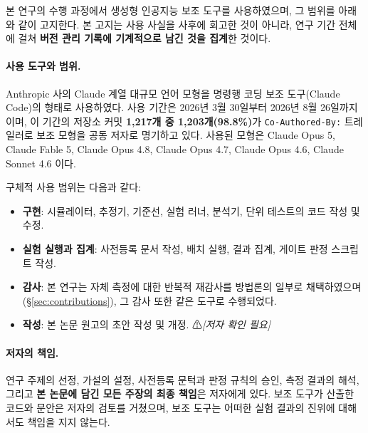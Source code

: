 \documentclass[11pt]{report}
\numberwithin{equation}{chapter}
\numberwithin{figure}{chapter}
\numberwithin{table}{chapter}
\begin{document}
\noindent
본 연구의 수행 과정에서 생성형 인공지능 보조 도구를 사용하였으며, 그 범위를 아래와 같이
고지한다. 본 고지는 사용 사실을 사후에 회고한 것이 아니라, 연구 기간 전체에 걸쳐
\textbf{버전 관리 기록에 기계적으로 남긴 것을 집계}한 것이다.

\paragraph{사용 도구와 범위.}
Anthropic 사의 Claude 계열 대규모 언어 모형을 명령행 코딩 보조 도구(Claude Code)의
형태로 사용하였다. 사용 기간은 2026년 3월 30일부터 2026년 8월 26일까지이며,
이 기간의 저장소 커밋 \textbf{1{,}217개 중 1{,}203개(98.8\%)}가
\texttt{Co-Authored-By:} 트레일러로 보조 모형을 공동 저자로 명기하고 있다.
사용된 모형은 Claude Opus 5, Claude Fable 5, Claude Opus 4.8, Claude Opus 4.7,
Claude Opus 4.6, Claude Sonnet 4.6 이다.

구체적 사용 범위는 다음과 같다:
\begin{itemize}
  \item \textbf{구현}: 시뮬레이터, 추정기, 기준선, 실험 러너, 분석기, 단위 테스트의
        코드 작성 및 수정.
  \item \textbf{실험 실행과 집계}: 사전등록 문서 작성, 배치 실행, 결과 집계,
        게이트 판정 스크립트 작성.
  \item \textbf{감사}: 본 연구는 자체 측정에 대한 반복적 재감사를 방법론의 일부로
        채택하였으며(\S\ref{sec:contributions}), 그 감사 또한 같은 도구로 수행되었다.
  \item \textbf{작성}: 본 논문 원고의 초안 작성 및 개정. ⚠\emph{[저자 확인 필요]}
\end{itemize}

\paragraph{저자의 책임.}
연구 주제의 선정, 가설의 설정, 사전등록 문턱과 판정 규칙의 승인, 측정 결과의 해석,
그리고 \textbf{본 논문에 담긴 모든 주장의 최종 책임}은 저자에게 있다.
보조 도구가 산출한 코드와 문안은 저자의 검토를 거쳤으며,
보조 도구는 어떠한 실험 결과의 진위에 대해서도 책임을 지지 않는다.
\end{document}

